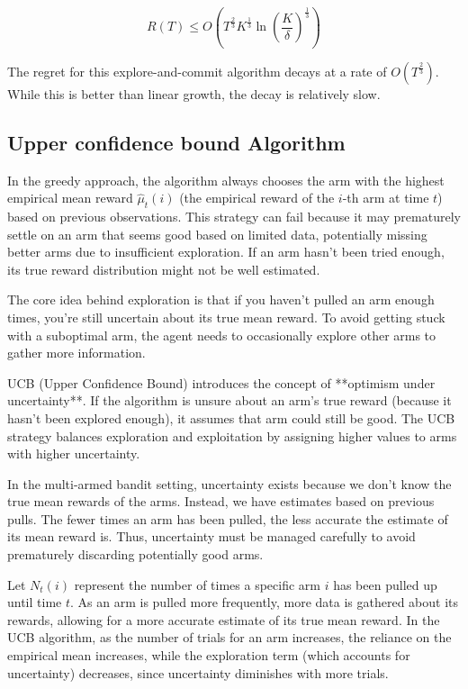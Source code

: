 $$
    R(T) \leq O(T^{\frac{2}{3}} K^{\frac{1}{3}} \ln(\frac{K}{\delta})^{\frac{1}{3}})
$$

The regret for this explore-and-commit algorithm decays at a rate of $O(T^{\frac{2}{3}})$. While this is better than linear growth, the decay is relatively slow.

\subsection{Upper confidence bound Algorithm}

In the greedy approach, the algorithm always chooses the arm with the highest empirical mean reward $\hat{\mu}_t(i)$ (the empirical reward of the $i$-th arm at time $t$) based on previous observations. This strategy can fail because it may prematurely settle on an arm that seems good based on limited data, potentially missing better arms due to insufficient exploration. If an arm hasn’t been tried enough, its true reward distribution might not be well estimated.

The core idea behind exploration is that if you haven't pulled an arm enough times, you're still uncertain about its true mean reward. To avoid getting stuck with a suboptimal arm, the agent needs to occasionally explore other arms to gather more information.

UCB (Upper Confidence Bound) introduces the concept of **optimism under uncertainty**. If the algorithm is unsure about an arm’s true reward (because it hasn’t been explored enough), it assumes that arm could still be good. The UCB strategy balances exploration and exploitation by assigning higher values to arms with higher uncertainty.

In the multi-armed bandit setting, uncertainty exists because we don’t know the true mean rewards of the arms. Instead, we have estimates based on previous pulls. The fewer times an arm has been pulled, the less accurate the estimate of its mean reward is. Thus, uncertainty must be managed carefully to avoid prematurely discarding potentially good arms.

Let $N_t(i)$ represent the number of times a specific arm $i$ has been pulled up until time $t$. As an arm is pulled more frequently, more data is gathered about its rewards, allowing for a more accurate estimate of its true mean reward. In the UCB algorithm, as the number of trials for an arm increases, the reliance on the empirical mean increases, while the exploration term (which accounts for uncertainty) decreases, since uncertainty diminishes with more trials.

